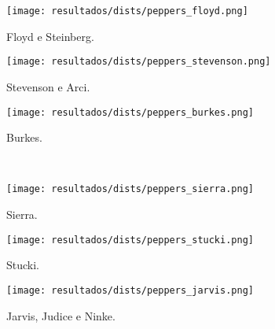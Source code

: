 \begin{subfigure}{0.33\textwidth}
    \centering
    \texttt{[image: resultados/dists/peppers\_floyd.png]}
    \caption{Floyd e Steinberg.}
    \label{fig:peppers:floyd}
\end{subfigure}%
\begin{subfigure}{0.33\textwidth}
    \centering
    \texttt{[image: resultados/dists/peppers\_stevenson.png]}
    \caption{Stevenson e Arci.}
    \label{fig:peppers:stevenson}
\end{subfigure}%
\begin{subfigure}{0.33\textwidth}
    \centering
    \texttt{[image: resultados/dists/peppers\_burkes.png]}
    \caption{Burkes.}
    \label{fig:peppers:burkes}
\end{subfigure}\\[8pt]
\begin{subfigure}{0.33\textwidth}
    \centering
    \texttt{[image: resultados/dists/peppers\_sierra.png]}
    \caption{Sierra.}
    \label{fig:peppers:sierra}
\end{subfigure}%
\begin{subfigure}{0.33\textwidth}
    \centering
    \texttt{[image: resultados/dists/peppers\_stucki.png]}
    \caption{Stucki.}
    \label{fig:peppers:stucki}
\end{subfigure}%
\begin{subfigure}{0.33\textwidth}
    \centering
    \texttt{[image: resultados/dists/peppers\_jarvis.png]}
    \caption{Jarvis, Judice e Ninke.}
    \label{fig:peppers:jarvis}
\end{subfigure}
